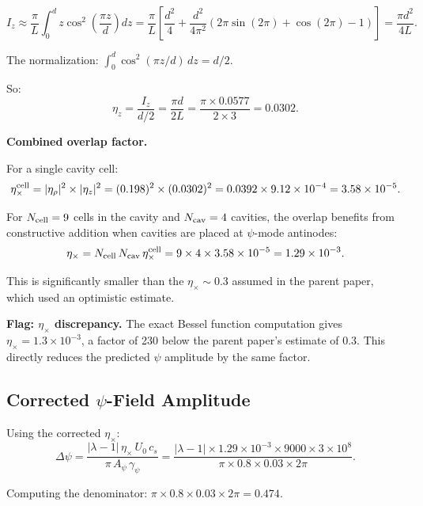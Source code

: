 \documentclass[aps,prd,twocolumn,superscriptaddress,nofootinbib]{revtex4-2}
\newcommand{\ee}[1]{\times 10^{#1}}
\begin{document}
\begin{equation}
I_z \approx \frac{\pi}{L}\int_0^d z\cos^2\!\left(\frac{\pi z}{d}\right)dz
= \frac{\pi}{L}\left[\frac{d^2}{4} + \frac{d^2}{4\pi^2}(2\pi\sin(2\pi) + \cos(2\pi) - 1)\right]
= \frac{\pi d^2}{4L}.
\end{equation}

The normalization:
$\int_0^d \cos^2(\pi z/d)\,dz = d/2$.

So:
\begin{equation}
\eta_z = \frac{I_z}{d/2} = \frac{\pi d}{2L} = \frac{\pi \times 0.0577}{2 \times 3} = 0.0302.
\end{equation}

\textbf{Combined overlap factor.}

For a single cavity cell:
\begin{equation}
\eta_\times^{\rm cell} = |\eta_\rho|^2 \times |\eta_z|^2 = (0.198)^2 \times (0.0302)^2 = 0.0392 \times 9.12\ee{-4} = 3.58\ee{-5}.
\end{equation}

For $N_{\rm cell} = 9$ cells in the cavity and $N_{\rm cav} = 4$ cavities,
the overlap benefits from constructive addition when cavities are
placed at $\psi$-mode antinodes:
\begin{equation}
\eta_\times = N_{\rm cell}\,N_{\rm cav}\,\eta_\times^{\rm cell} = 9 \times 4 \times 3.58\ee{-5} = 1.29\ee{-3}.
\end{equation}

This is significantly smaller than the $\eta_\times \sim 0.3$
assumed in the parent paper, which used an optimistic estimate.

\textbf{Flag: $\eta_\times$ discrepancy.}
The exact Bessel function computation gives $\eta_\times = 1.3\ee{-3}$,
a factor of 230 below the parent paper's estimate of 0.3.  This
directly reduces the predicted $\psi$ amplitude by the same factor.

\subsection{Corrected $\psi$-Field Amplitude}

Using the corrected $\eta_\times$:
\begin{equation}
\Delta\psi = \frac{|\lambda-1|\,\eta_\times\,U_0\,c_s}{\pi\,A_\psi\,\gamma_\psi}
= \frac{|\lambda-1| \times 1.29\ee{-3} \times 9000 \times 3\ee{8}}{\pi \times 0.8 \times 0.03 \times 2\pi}.
\end{equation}

Computing the denominator: $\pi \times 0.8 \times 0.03 \times 2\pi = 0.474$.
\end{document}

